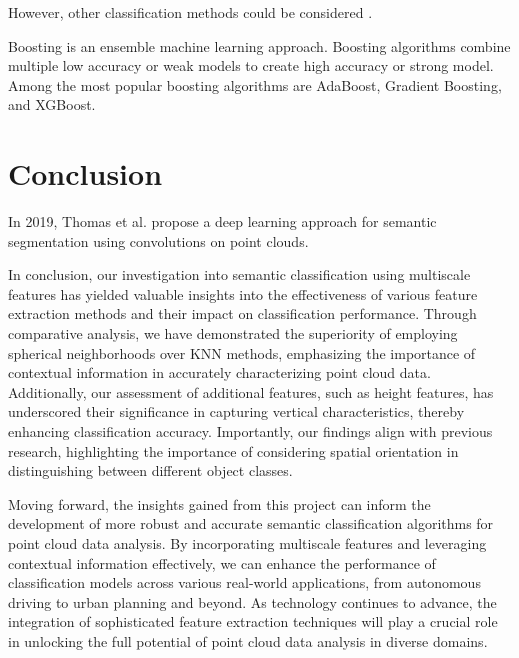 \documentclass{article}
\begin{document}
However, other classification methods could be considered \cite{atik_machine_2021}. 

Boosting is an ensemble machine learning approach. Boosting algorithms combine multiple low accuracy or weak models to create high accuracy or strong model. Among the most popular boosting algorithms are AdaBoost, Gradient Boosting, and XGBoost.

\section{Conclusion}

In 2019, Thomas et al. \cite{thomas_kpconv_2019} propose a deep learning approach for semantic segmentation using convolutions on point clouds.

In conclusion, our investigation into semantic classification using multiscale features has yielded valuable insights into the effectiveness of various feature extraction methods and their impact on classification performance. Through comparative analysis, we have demonstrated the superiority of employing spherical neighborhoods over KNN methods, emphasizing the importance of contextual information in accurately characterizing point cloud data. Additionally, our assessment of additional features, such as height features, has underscored their significance in capturing vertical characteristics, thereby enhancing classification accuracy. Importantly, our findings align with previous research, highlighting the importance of considering spatial orientation in distinguishing between different object classes.

Moving forward, the insights gained from this project can inform the development of more robust and accurate semantic classification algorithms for point cloud data analysis. By incorporating multiscale features and leveraging contextual information effectively, we can enhance the performance of classification models across various real-world applications, from autonomous driving to urban planning and beyond. As technology continues to advance, the integration of sophisticated feature extraction techniques will play a crucial role in unlocking the full potential of point cloud data analysis in diverse domains.

\newpage


\end{document}
